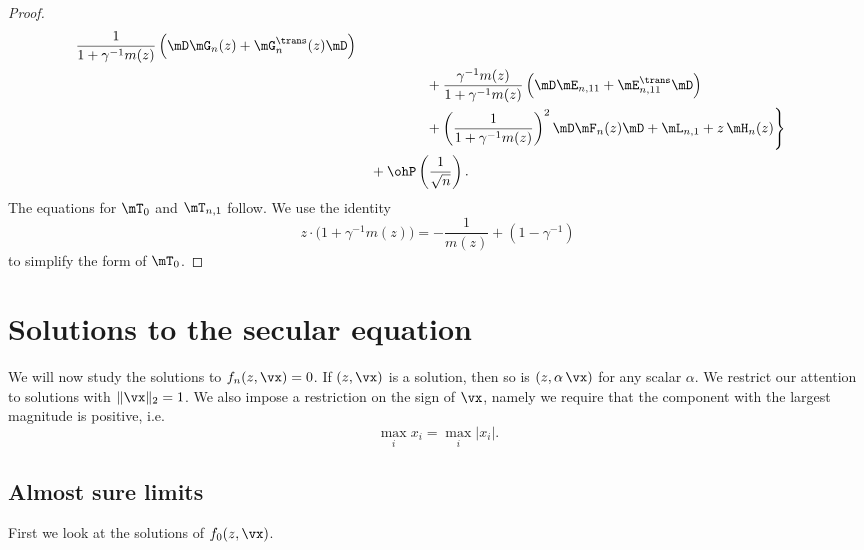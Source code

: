 \begin{proof}
\[\begin{split}
                    \frac{1}{1 + \gamma^{-1} m(z)}
                        \left( 
                            \mD \mG_n(z) 
                            + \mG_n^\trans(z) \mD 
                        \right) \\
                    &\quad\qquad\qquad+
                    \frac{\gamma^{-1} m(z)}{1 + \gamma^{-1} m(z)}
                    \left( \mD \mE_{n,11} + \mE_{n,11}^\trans \mD \right) \\
                    &\quad\qquad\qquad+
                    \left(
                        \frac{1}{1 + \gamma^{-1} m(z)}
                    \right)^2
                    \mD \mF_n(z) \mD
                    +
                    \mL_{n,1}
                    +
                    z \, \mH_n( z ) \Bigg\} \\
                &\quad+
                \ohP\left( \frac{1}{\sqrt{n}} \right).
        \end{split}
    \]
    The equations for $\mT_0$ and $\mT_{n,1}$ follow.  We use the identity
    \[
        z
        \cdot
        \Big(
            1
            +
            \gamma^{-1} m(z)
        \Big)
        =
        -
        \frac{1}{m(z)}
        +
        (1 - \gamma^{-1})
    \]
    to simplify the form of $\mT_0$.
\end{proof}

\section{Solutions to the secular equation}\label{S:solutions-to-secular-eq}

We will now study the solutions to $f_{n}(z, \vx) = 0$.  If $(z, \vx)$
is a solution, then so is $(z, \alpha \, \vx)$ for any scalar $\alpha$.  We restrict our attention to solutions with $\|\vx \|_2 = 1$.  We also impose a restriction on the sign of $\vx$, namely we require that the component with the largest magnitude is positive, i.e.
\begin{equation}\label{E:x-identifiability}
    \max_i x_i = \max_i | x_i |.
\end{equation}

\subsection{Almost sure limits}

First we look at the solutions of $f_0(z, \vx)$.  

